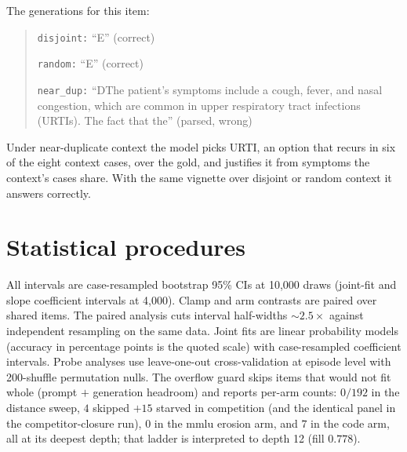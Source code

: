 \documentclass{article}
\begin{document}
\noindent The generations for this item:

\begin{quote}\small
\texttt{disjoint:} ``E'' \hfill (correct)\par\smallskip
\texttt{random:} ``E'' \hfill (correct)\par\smallskip
\texttt{near\_dup:} ``D\quad The patient's symptoms include a cough, fever, and nasal
congestion, which are common in upper respiratory tract infections (URTIs). The fact that
the'' \hfill (parsed, wrong)
\end{quote}

\noindent Under near-duplicate context the model picks URTI, an option that recurs in six of
the eight context cases, over the gold, and justifies it from symptoms the context's cases
share. With the same vignette over disjoint or random context it answers correctly.

\section{Statistical procedures}
\label{app:stats}

All intervals are case-resampled bootstrap 95\% CIs at 10{,}000 draws (joint-fit and slope
coefficient intervals at 4{,}000). Clamp and arm contrasts
are paired over shared items. The paired analysis cuts interval half-widths
${\sim}2.5\times$ against independent resampling on the same data. Joint fits are linear
probability models (accuracy in percentage points is the quoted scale) with case-resampled
coefficient intervals. Probe analyses use leave-one-out cross-validation at episode level with
200-shuffle permutation nulls. The overflow guard skips items that would not fit whole
(prompt $+$ generation headroom) and reports per-arm counts: $0/192$ in the distance sweep,
$4$ skipped $+15$ starved in competition (and the identical panel in the competitor-closure
run), $0$ in the mmlu erosion arm, and $7$ in the code arm, all at its deepest depth; that
ladder is interpreted to depth 12 (fill $0.778$).
\end{document}
